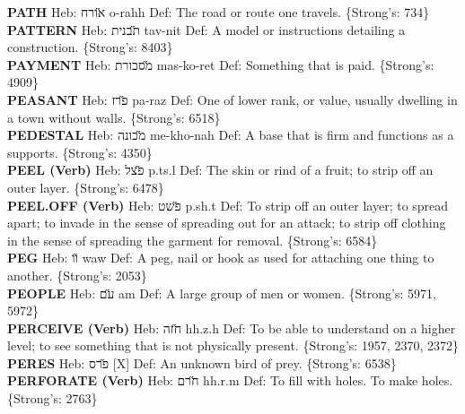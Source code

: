 {\textbf{PATH} Heb: {\large\H אורח} o-rahh Def: The road or route one travels. \{Strong's: 734\}\hfill{}\\

\textbf{PATTERN} Heb: {\large\H תבנית} tav-nit Def: A model or instructions detailing a construction. \{Strong's: 8403\}\hfill{}\\

\textbf{PAYMENT} Heb: {\large\H מסכורת} mas-ko-ret Def: Something that is paid. \{Strong's: 4909\}\hfill{}\\

\textbf{PEASANT} Heb: {\large\H פרז} pa-raz Def: One of lower rank, or value, usually dwelling in a town without walls. \{Strong's: 6518\}\hfill{}\\

\textbf{PEDESTAL} Heb: {\large\H מכונה} me-kho-nah Def: A base that is firm and functions as a supports. \{Strong's: 4350\}\hfill{}\\

\textbf{PEEL (Verb)} Heb: {\large\H פצל} p.ts.l Def: The skin or rind of a fruit; to strip off an outer layer. \{Strong's: 6478\}\hfill{}\\

\textbf{PEEL.OFF (Verb)} Heb: {\large\H פשט} p.sh.t Def: To strip off an outer layer; to spread apart; to invade in the sense of spreading out for an attack; to strip off clothing in the sense of spreading the garment for removal. \{Strong's: 6584\}\hfill{}\\

\textbf{PEG} Heb: {\large\H וו} waw Def: A peg, nail or hook as used for attaching one thing to another. \{Strong's: 2053\}\hfill{}\\

\textbf{PEOPLE} Heb: {\large\H עם} am Def: A large group of men or women. \{Strong's: 5971, 5972\}\hfill{}\\

\textbf{PERCEIVE (Verb)} Heb: {\large\H חזה} hh.z.h Def: To be able to understand on a higher level; to see something that is not physically present. \{Strong's: 1957, 2370, 2372\}\hfill{}\\

\textbf{PERES} Heb: {\large\H פרס} {[}X{]} Def: An unknown bird of prey. \{Strong's: 6538\}\hfill{}\\

\textbf{PERFORATE (Verb)} Heb: {\large\H חרם} hh.r.m Def: To fill with holes. To make holes. \{Strong's: 2763\}\hfill{}\\

}
